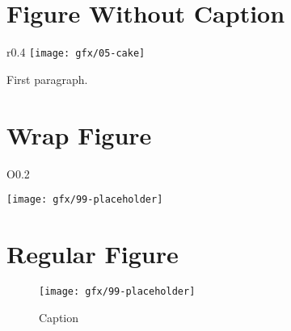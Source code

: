 \section{Figure Without Caption}

\begin{wrapfigure}{r}{0.4\textwidth}
	\centering
	\texttt{[image: gfx/05-cake]} 
\end{wrapfigure}

First paragraph.

\section{Wrap Figure}
\begin{wrapfigure}{O}{0.2\textwidth}
	\caption{} %
	\label{03:fig02} 
	\centering
	\texttt{[image: gfx/99-placeholder]} 
\end{wrapfigure}


\section{Regular Figure}
\begin{figure}[H]
	\centering
	\texttt{[image: gfx/99-placeholder]}
	\caption{Caption}
	\label{03:fig03}
\end{figure}



